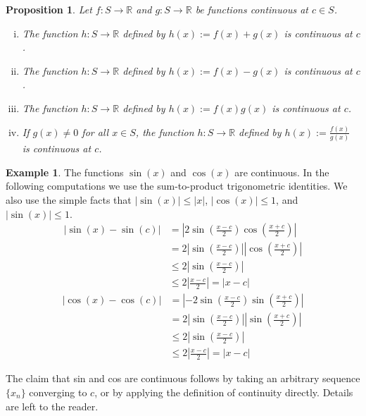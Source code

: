 \documentclass[12pt]{book}
\newcommand{\abs}[1]{\left\lvert {#1} \right\rvert}
\newcommand{\R}{{\mathbb{R}}}
\theoremstyle{plain}
\newtheorem{prop}[thm]{Proposition}
\theoremstyle{remark}
\theoremstyle{definition}
\theoremstyle{exercise}
\theoremstyle{example}
\newtheorem{example}[thm]{Example}
\begin{document}
\begin{prop} \label{contalg:prop}
Let $f \colon S \to \R$ and $g \colon S \to \R$ be functions
continuous at $c \in S$.
\begin{enumerate}[(i)]
\item The function $h \colon S \to \R$ defined by
$h(x) := f(x)+g(x)$ is continuous at $c$.
\item The function $h \colon S \to \R$ defined by
$h(x) := f(x)-g(x)$ is continuous at $c$.
\item The function $h \colon S \to \R$ defined by
$h(x) := f(x)g(x)$ is continuous at $c$.
\item If $g(x)\not=0$ for all $x \in S$, the function $h \colon S \to \R$
defined by $h(x) := \frac{f(x)}{g(x)}$ is continuous at $c$.
\end{enumerate}
\end{prop}

\begin{example} \label{sincos:example}
The functions $\sin(x)$ and $\cos(x)$ are continuous.
In the following computations we use the sum-to-product
trigonometric identities.  We also use the simple facts that
$\abs{\sin(x)} \leq \abs{x}$, $\abs{\cos(x)} \leq 1$,
and $\abs{\sin(x)} \leq 1$.
\begin{equation*}
\begin{split}
\abs{\sin(x)-\sin(c)} & =
\abs{
2 \sin \left( \frac{x-c}{2} \right) \cos \left( \frac{x+c}{2} \right)
}
\\
& =
2
\abs{ \sin \left( \frac{x-c}{2} \right) }
\abs{ \cos \left( \frac{x+c}{2} \right) }
\\
& \leq
2
\abs{ \sin \left( \frac{x-c}{2} \right) }
\\
& \leq
2
\abs{ \frac{x-c}{2} }
= \abs{x-c}
\end{split}
\end{equation*}
\begin{equation*}
\begin{split}
\abs{\cos(x)-\cos(c)} & =
\abs{
-2 \sin \left( \frac{x-c}{2} \right) \sin \left( \frac{x+c}{2} \right)
}
\\
& =
2
\abs{ \sin \left( \frac{x-c}{2} \right) }
\abs{ \sin \left( \frac{x+c}{2} \right) }
\\
& \leq
2
\abs{ \sin \left( \frac{x-c}{2} \right) }
\\
& \leq
2
\abs{ \frac{x-c}{2} }
= \abs{x-c}
\end{split}
\end{equation*}

The claim that sin and cos are continuous follows by taking an
arbitrary sequence $\{ x_n \}$ converging to $c$, or by applying the
definition of continuity directly.  Details are left to the
reader.
\end{example}
\end{document}

